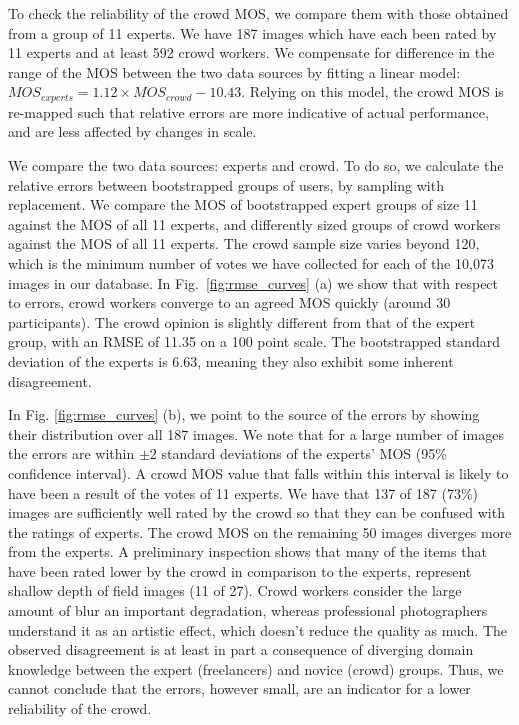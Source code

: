 \documentclass{article}
\begin{document}
To check the reliability of the crowd MOS, we compare them with those obtained from a group of 11 experts. We have 187 images which have each been rated by 11 experts and at least 592 crowd workers. We compensate for difference in the range of the MOS between the two data sources by fitting a linear model: ${MOS}_{experts} = 1.12\times{MOS}_{crowd} - 10.43$. Relying on this model, the crowd MOS is re-mapped such that relative errors are more indicative of actual performance, and are less affected by changes in scale. 



We compare the two data sources: experts and crowd. To do so, we calculate the relative errors between bootstrapped groups of users, by sampling with replacement. We compare the MOS of bootstrapped expert groups of size 11 against the MOS of all 11 experts, and differently sized groups of crowd workers against the MOS of all 11 experts. The crowd sample size varies beyond 120, which is the minimum number of votes we have collected for each of the 10,073 images in our database. In Fig.~\ref{fig:rmse_curves} (a) we show that with respect to errors, crowd workers converge to an agreed MOS quickly (around 30 participants). The crowd opinion is slightly different from that of the expert group, with an RMSE of 11.35 on a 100 point scale. The bootstrapped standard deviation of the experts is 6.63, meaning they also exhibit some inherent disagreement.
 
In Fig. \ref{fig:rmse_curves} (b), we point to the source of the errors by showing their distribution over all 187 images. We note that for a large number of images the errors are within $\pm 2$ standard deviations of the experts' MOS (95\% confidence interval). A crowd MOS value that falls within this interval is likely to have been a result of the votes of 11 experts. We have that 137 of 187 (73\%) images are sufficiently well rated by the crowd so that they can be confused with the ratings of experts. The crowd MOS on the remaining 50 images diverges more from the experts. A preliminary inspection shows that many of the items that have been rated lower by the crowd in comparison to the experts, represent shallow depth of field images (11 of 27). Crowd workers consider the large amount of blur an important degradation, whereas professional photographers understand it as an artistic effect, which doesn't reduce the quality as much. The observed disagreement is at least in part a consequence of diverging domain knowledge between the expert (freelancers) and novice (crowd) groups. Thus, we cannot conclude that the errors, however small, are an indicator for a lower reliability of the crowd.
\end{document}
